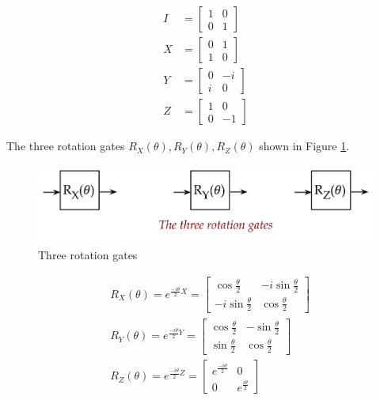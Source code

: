 \documentclass[main.tex]{subfiles}
\begin{document}
    $$
    \begin{aligned}
    I &=\left[\begin{array}{ll}
    1 & 0 \\
    0 & 1
    \end{array}\right] \\
    X &=\left[\begin{array}{ll}
    0 & 1 \\
    1 & 0
    \end{array}\right] \\
    Y &=\left[\begin{array}{cc}
    0 & -i \\
    i & 0
    \end{array}\right] \\
    Z &=\left[\begin{array}{cc}
    1 & 0 \\
    0 & -1
    \end{array}\right]
    \end{aligned}
    $$
    
    The three rotation gates $R_{X}(\theta), R_{Y}(\theta), R_{Z}(\theta)$ shown in Figure \ref{fig:11gate2}.
    
    \begin{figure}
        \centering
        \includegraphics[width=5in]{notes/figs/n08/11gate2.png}
        \caption{Three rotation gates}
        \label{fig:11gate2}
    \end{figure}
    
    $$
    \begin{aligned}
    &R_{X}(\theta)=e^{\frac{-i \theta}{2} X}=\left[\begin{array}{cc}
    \cos \frac{\theta}{2} & -i \sin \frac{\theta}{2} \\
    -i \sin \frac{\theta}{2} & \cos \frac{\theta}{2}
    \end{array}\right] \\
    &R_{Y}(\theta)=e^{\frac{-i \theta}{2} Y}=\left[\begin{array}{cc}
    \cos \frac{\theta}{2} & -\sin \frac{\theta}{2} \\
    \sin \frac{\theta}{2} & \cos \frac{\theta}{2}
    \end{array}\right] \\
    &R_{Z}(\theta)=e^{\frac{-i \theta}{2} Z}=\left[\begin{array}{cc}
    e^{\frac{-i \theta}{2}} & 0 \\
    0 & e^{\frac{i \theta}{2}}
    \end{array}\right]
    \end{aligned}
    $$
    
\end{document}
